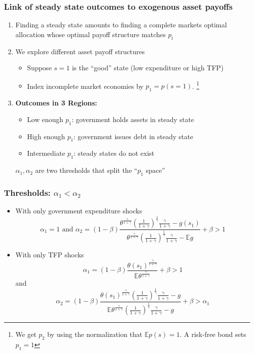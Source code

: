 \documentclass{beamer}
\newcommand{\EE}{\mathbb E}
\begin{document}
 \begin{frame}
  \frametitle{Link of steady state outcomes to exogenous asset payoffs}
  \begin{enumerate}
   \item Finding a steady state amounts to finding a complete markets optimal allocation whose optimal payoff structure matches $p_t$
  \item We explore different asset payoff structures
  \begin{itemize}
   \item  Suppose $s=1$ is the ``good'' state (low expenditure or high TFP)
   \item Index incomplete market economies by $p_1=p(s=1)$. \footnote{We get  $p_2$ by using the normalization that $\mathbb{E}p(s)=1$. A risk-free bond sets $p_1=1$}
    \end{itemize}
  \item \textbf{Outcomes in 3 Regions: }
  \begin{itemize}
   \item Low enough $p_1$: government holds assets in steady state
   \item High enough $p_1$: government  issues debt  in steady state
   \item Intermediate $p_1$: steady states do not exist
  \end{itemize}
$\alpha_1,\alpha_2$ are two thresholds   that split the ``$p_1$ space''
  \end{enumerate}

 \end{frame}

\begin{frame}
 \frametitle{Thresholds: $\alpha_1 <\alpha_2$}
	\begin{itemize}
		\item With only government expenditure shocks
		\[
			\alpha_1 = 1 \text{  and }  \alpha_2 = (1-\beta)\frac{\theta^\frac{\gamma}{1+\gamma}\left(\frac{1}{1+\gamma}\right)^\frac1\gamma\frac{\gamma}{1+\gamma}-g(s_1)}{\theta^\frac{\gamma}{1+\gamma}\left(\frac{1}{1+\gamma}\right)^\frac1\gamma\frac{\gamma}{1+\gamma}-\EE g} +\beta>1
		\]
		\item With only TFP shocks
		\[
			\alpha_1 = (1-\beta)\frac{\theta(s_1)^\frac{\gamma}{1+\gamma}}{\EE\theta^\frac{\gamma}{1+\gamma}}+\beta > 1
		\]and
		\[
		\alpha_2 = (1-\beta)\frac{\theta(s_1)^\frac{\gamma}{1+\gamma}\left(\frac{1}{1+\gamma}\right)^\frac1\gamma\frac{\gamma}{1+\gamma}-g}{\EE\theta^\frac{\gamma}{1+\gamma}\left(\frac{1}{1+\gamma}\right)^\frac1\gamma\frac{\gamma}{1+\gamma}-g}+\beta>\alpha_1
		\]
	\end{itemize}
 \end{frame}
\end{document}
